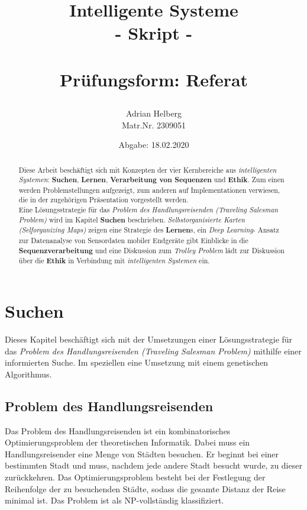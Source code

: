\documentclass[11pt]{article}
\title{
    \begin{center}
        \Huge \textbf{Intelligente Systeme}\\
        {\color{blue}- Skript -}\\~\\
        \Large Prüfungsform: Referat
    \end{center}
}
\author{Adrian Helberg\\ Matr.Nr. 2309051}
\date{Abgabe: 18.02.2020}
\begin{document}
    \maketitle

    \begin{abstract}
        Diese Arbeit beschäftigt sich mit Konzepten der vier Kernbereiche aus \textit{intelligenten
        Systemen}: \textbf{Suchen}, \textbf{Lernen}, \textbf{Verarbeitung von Sequenzen} und
        \textbf{Ethik}. Zum einen werden Problemstellungen aufgezeigt, zum anderen auf
        Implementationen verwiesen, die in der zugehörigen Präsentation vorgestellt werden.\\ Eine
        Lösungsstrategie für das \textit{Problem des Handlungsreisenden (Traveling Salesman
        Problem)} wird im Kapitel \textbf{Suchen} beschrieben. \textit{Selbstorganisierte Karten
            (Selforganizing Maps)} zeigen eine Strategie des \textbf{Lernen}s, ein \textit{Deep
        Learning}- Ansatz zur Datenanalyse von Sensordaten mobiler Endgeräte gibt Einblicke in
        die \textbf{Sequenzverarbeitung} und eine Diskussion zum \textit{Trolley Problem} lädt
        zur Diskussion über die \textbf{Ethik} in Verbindung mit \textit{intelligenten Systemen}
        ein.
    \end{abstract}

    \tableofcontents
    \newpage

    \section{Suchen}

    Dieses Kapitel beschäftigt sich mit der Umsetzungen einer Lösungsstrategie für das
    \textit{Problem des Handlungsreisenden (Traveling Salesman Problem)} mithilfe einer
    informierten Suche. Im speziellen eine Umsetzung mit einem genetischen Algorithmus.

    \subsection{Problem des Handlungsreisenden}
    Das Problem des Handlungsreisenden ist ein kombinatorisches Optimierungsproblem der
    theoretischen Informatik. Dabei muss ein Handlungsreisender eine Menge von Städten besuchen.
    Er beginnt bei einer bestimmten Stadt und muss, nachdem jede andere Stadt besucht wurde, zu
    dieser zurückkehren. Das Optimierungsproblem besteht bei der Festlegung der Reihenfolge der zu
    besuchenden Städte, sodass die gesamte Distanz der Reise minimal ist. Das Problem ist als
    NP-vollständig klassifiziert.
\end{document}
